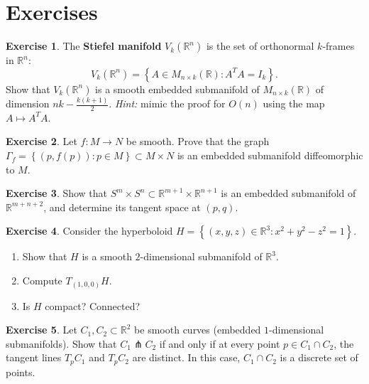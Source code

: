 \documentclass[12pt,a4paper,openany]{book}
\theoremstyle{definition}
\newtheorem{exercise}{Exercise}[chapter]
\theoremstyle{remark}
\newcommand{\R}{\mathbb{R}}
\newcommand{\set}[1]{\left\{ #1 \right\}}
\begin{document}
\section{Exercises}

\begin{exercise}\label{exo:Stiefel}%
The \textbf{Stiefel manifold} $V_k(\R^n)$ is the set of orthonormal
$k$-frames in $\R^n$:
\[
  V_k(\R^n) = \set{A \in M_{n \times k}(\R) : A^T A = I_k}.
\]
Show that $V_k(\R^n)$ is a smooth embedded submanifold of
$M_{n \times k}(\R)$ of dimension $nk - \frac{k(k+1)}{2}$.
\textit{Hint:} mimic the proof for $O(n)$ using the map
$A \mapsto A^T A$.
\end{exercise}

\begin{exercise}\label{exo:graph-submanifold}%
Let $f \colon M \to N$ be smooth.  Prove that the graph
$\Gamma_f = \set{(p, f(p)) : p \in M} \subset M \times N$ is an
embedded submanifold diffeomorphic to $M$.
\end{exercise}

\begin{exercise}\label{exo:product-of-spheres}
Show that $S^m \times S^n \subset \R^{m+1} \times \R^{n+1}$ is an
embedded submanifold of $\R^{m+n+2}$, and determine its tangent space
at $(p, q)$.
\end{exercise}

\begin{exercise}\label{exo:hyperboloid}%
Consider the hyperboloid
$H = \set{(x, y, z) \in \R^3 : x^2 + y^2 - z^2 = 1}$.
\begin{enumerate}[label=(\alph*)]
  \item Show that $H$ is a smooth $2$-dimensional submanifold of $\R^3$.
  \item Compute $T_{(1,0,0)}H$.
  \item Is $H$ compact?  Connected?
\end{enumerate}
\end{exercise}

\begin{exercise}\label{exo:transverse-curves}
Let $C_1, C_2 \subset \R^2$ be smooth curves (embedded $1$-dimensional
submanifolds).  Show that $C_1 \pitchfork C_2$ if and only if at every
point $p \in C_1 \cap C_2$, the tangent lines $T_pC_1$ and $T_pC_2$
are distinct.  In this case, $C_1 \cap C_2$ is a discrete set of points.
\end{exercise}
\end{document}

